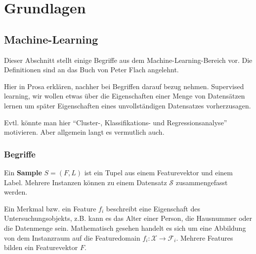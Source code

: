 
\newpage

\section{Grundlagen}
\textit{}

\subsection{Machine-Learning}
Dieser Abschnitt stellt einige Begriffe aus dem Machine-Learning-Bereich vor. 
Die Definitionen sind an das Buch von Peter Flach \cite{Flach:2012:MLA:2490546} angelehnt.

Hier in Prosa erklären, nachher bei Begriffen darauf bezug nehmen.
Supervised learning, wir wollen etwas über die Eigenschaften einer Menge von Datensätzen lernen um später 
Eigenschaften eines unvollständigen Datensatzes vorherzusagen.

Evtl. könnte man hier 
``Cluster-, Klassifikations- und Regressionsanalyse'' motivieren.
Aber allgemein langt es vermutlich auch.



\subsubsection{Begriffe}

\begin{term}[Instanz]
Ein \textbf{Sample} $S = (F, L)$ ist ein Tupel aus einem Featurevektor und einem Label. 
Mehrere Instanzen können zu einem Datensatz $\mathcal{S}$ zusammengefasst werden.
\end{term}


\begin{term}[Modell]
\end{term}

\begin{term}[Datensatz]
\end{term}

\begin{term}
Ein Merkmal bzw. ein Feature $f_i$ beschreibt eine Eigenschaft des Untersuchungsobjekts, z.B. kann es das Alter einer Person, die Hausnummer oder die Datenmenge sein. 
Mathematisch gesehen handelt es sich um eine Abbildung von dem Instanzraum auf die Featuredomain $f_i : \mathscr{X} \rightarrow \mathscr{F}_i$. 
Mehrere Features bilden ein Featurevektor $F$. 
\end{term}

